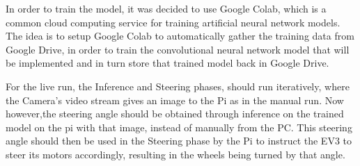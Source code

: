 In order to train the model, it was decided to use Google Colab, which is a common cloud computing service for training artificial neural network models.
The idea is to setup Google Colab to automatically gather the training data from Google Drive, in order to train the convolutional neural network model that will be implemented and in turn store that trained model back in Google Drive.

For the live run, the Inference and Steering phases, should run iteratively, where the Camera's video stream gives an image to the Pi as in the manual run.
Now however,the steering angle should be obtained through inference on the trained model on the pi with that image, instead of manually from the PC.
This steering angle should then be used in the Steering phase by the Pi to instruct the EV3 to steer its motors accordingly, resulting in the wheels being turned by that angle.
